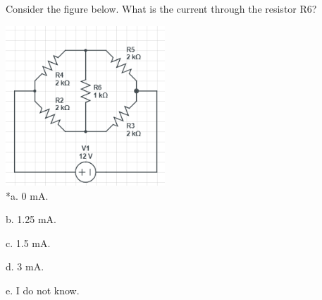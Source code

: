 
Consider the figure below. What is the current through the resistor R6?

\includegraphics[width=2.35in,height=2.35833in]{../../Images/KirchhoffsLawsQ7.png}\\

*a. 0 mA.

b. 1.25 mA.

c. 1.5 mA.

d. 3 mA.

e. I do not know.\\
